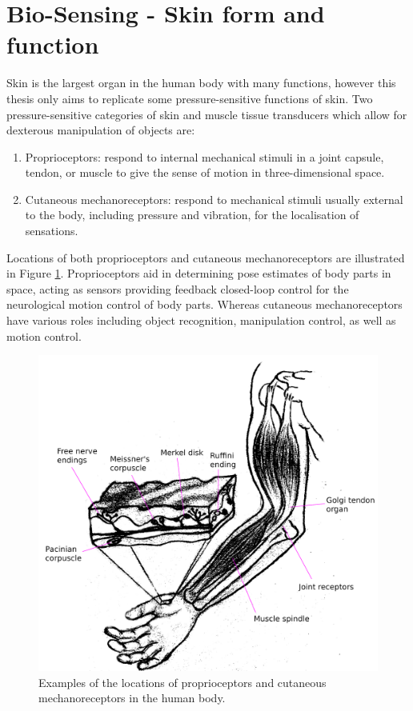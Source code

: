 \section{Bio-Sensing - Skin form and function}
Skin is the largest organ in the human body with many functions, however this thesis only aims to replicate some pressure-sensitive functions of skin. Two pressure-sensitive categories of skin and muscle tissue transducers which allow for dexterous manipulation of objects are:
\begin{enumerate} 
    \item Proprioceptors: respond to internal mechanical stimuli in a joint capsule, tendon, or muscle to give the sense of motion in three-dimensional space.
    \item Cutaneous mechanoreceptors:  respond to mechanical stimuli usually external to the body, including pressure and vibration, for the localisation of sensations. 
\end{enumerate} 
Locations of both proprioceptors and cutaneous mechanoreceptors are illustrated in Figure \ref{fig:proprioceptors-mechanoreceptors}. Proprioceptors aid in determining pose estimates of body parts in space, acting as sensors providing feedback closed-loop control for the neurological motion control of body parts. Whereas cutaneous mechanoreceptors have various roles including object recognition, manipulation control, as well as motion control.
\begin{figure}[H]
    \centering
    \includegraphics[width=0.6\linewidth]{Figures/propriocetors_n_cutaneous_mechanoreceptors_labelled.png}
    \caption{Examples of the locations of proprioceptors and cutaneous mechanoreceptors in the human body.}
    \label{fig:proprioceptors-mechanoreceptors}
\end{figure}

